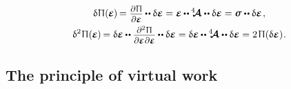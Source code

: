 \nopagebreak\vspace{-0.2em}
\begin{equation}\label{thefirstandsecondvariationsofpotentialenergydensity.linearelasticity}
\begin{gathered}
\variation{\hspace{.1ex}\potentialenergydensity}
( \hspace{-0.1ex}
    \infinitesimaldeformation
\hspace{-0.1ex} ) \hspace{-0.2ex}
= \scalebox{.9}{$
    \displaystyle\frac{
        \raisemath{-0.16em}
        {\partial \hspace{.1ex} \potentialenergydensity}}
        {\partial \infinitesimaldeformation}
    $} \hspace{-0.1ex}
\dotdotp
\variation{\infinitesimaldeformation}
= \infinitesimaldeformation
\hspace{-0.1ex} \dotdotp \hspace{-0.1ex}
\stiffnesstensor
\dotdotp
\variation{\infinitesimaldeformation}
= \linearstress
\dotdotp
\variation{\infinitesimaldeformation}
\hspace{.2ex} ,
\\
%
\secondvariation{\hspace{.1ex}\potentialenergydensity}(\hspace{-0.1ex}
\infinitesimaldeformation
\hspace{-0.1ex}) \hspace{-0.2ex}
= \variation{\infinitesimaldeformation}
\hspace{-0.1ex} \dotdotp
\scalebox{.9}{$ \displaystyle\frac{\raisemath{-0.16em}{\partial^2 \hspace{.1ex} \potentialenergydensity}}{ \partial \infinitesimaldeformation \hspace{.1ex} \partial \infinitesimaldeformation } $}
\hspace{-0.1ex} \dotdotp
\variation{\infinitesimaldeformation}
= \variation{\infinitesimaldeformation}
\hspace{-0.1ex} \dotdotp
\stiffnesstensor
\dotdotp
\variation{\infinitesimaldeformation}
= 2 \hspace{.25ex} \potentialenergydensity (\variation{\infinitesimaldeformation})
\hspace{.1ex} .
\end{gathered}
\end{equation}

\subsection*{The principle of virtual work}

